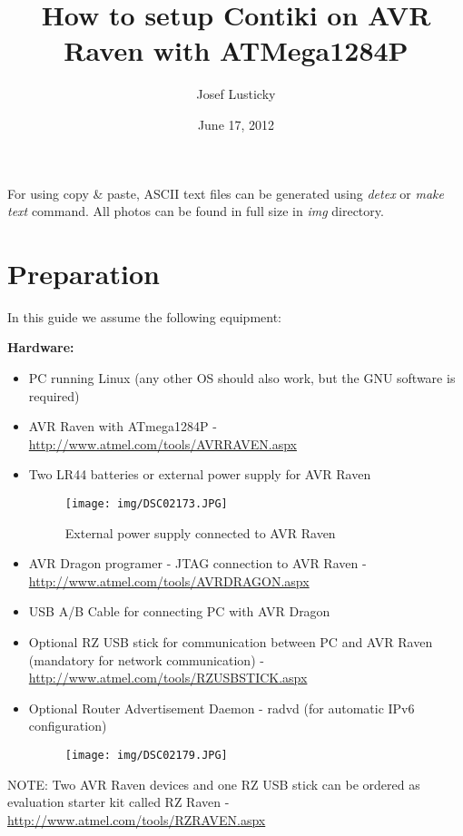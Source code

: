 \documentclass{article}
\begin{document}
\title{How to setup Contiki on AVR Raven with ATMega1284P}
\author{Josef Lusticky}
\date{June 17, 2012}

\maketitle

For using copy \& paste, ASCII text files can be generated
using {\it{detex}} or {\it{make text}} command.
All photos can be found in full size in {\it{img}} directory.

\section{Preparation}
In this guide we assume the following equipment:

\vspace{0.2cm}

{\textbf{Hardware:}}
\begin{itemize}
	\item PC running Linux (any other OS should also work, but the GNU software is required)
	\item AVR Raven with ATmega1284P - \url{http://www.atmel.com/tools/AVRRAVEN.aspx}
	\item Two LR44 batteries or external power supply for AVR Raven
\begin{figure}[H]
  \centering
  \texttt{[image: img/DSC02173.JPG]}
  \caption{External power supply connected to AVR Raven} %
  \label{psu}
  \bigskip
\end{figure}
	\item AVR Dragon programer - JTAG connection to AVR Raven - \url{http://www.atmel.com/tools/AVRDRAGON.aspx}
	\item USB A/B Cable for connecting PC with AVR Dragon
	\item Optional RZ USB stick for communication between PC and AVR Raven
	(mandatory for network communication) - \url{http://www.atmel.com/tools/RZUSBSTICK.aspx}
	\item Optional Router Advertisement Daemon - radvd (for automatic IPv6 configuration)
\begin{figure}[H]
  \centering
  \texttt{[image: img/DSC02179.JPG]}
  \label{usb}
  \bigskip
\end{figure}
\end{itemize}

NOTE: Two AVR Raven devices and one RZ USB stick can be ordered as
evaluation starter kit called RZ Raven - \url{http://www.atmel.com/tools/RZRAVEN.aspx}
\end{document}
